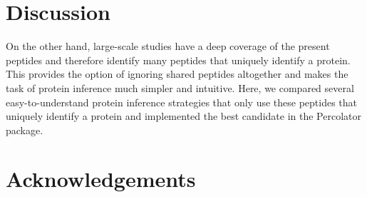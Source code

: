 \documentclass{article}
\begin{document}

\section*{Discussion}

On the other hand, large-scale studies have a deep coverage of the
present peptides and therefore identify many peptides that uniquely
identify a protein. This provides the option of ignoring shared
peptides altogether and makes the task of protein inference much
simpler and intuitive. Here, we compared several easy-to-understand
protein inference strategies that only use these peptides that
uniquely identify a protein and implemented the best candidate in the
Percolator package.


\section*{Acknowledgements}


{} 

\end{document}
